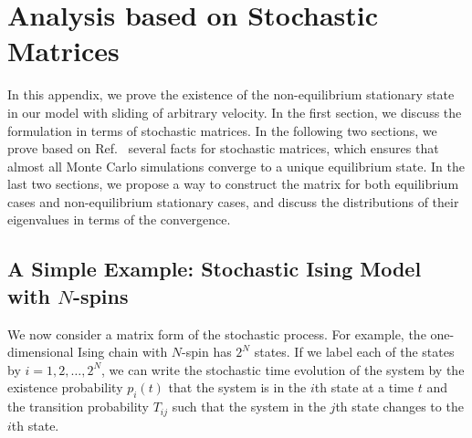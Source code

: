 
\chapter{Analysis based on Stochastic Matrices}\label{chap:ProofEx}

In this appendix, we prove the existence of the non-equilibrium stationary state in our model with sliding of arbitrary velocity. In the first section, we discuss the formulation in terms of stochastic matrices. In the following two sections, we prove based on Ref.~\cite{Hara2011} several facts for stochastic matrices, which ensures that almost all Monte Carlo simulations converge to a unique equilibrium state. In the last two sections, we propose a way to construct the matrix for both equilibrium cases and non-equilibrium stationary cases, and discuss the distributions of their eigenvalues in terms of the convergence.

\section{A Simple Example: Stochastic Ising Model with $N$-spins}
We now consider a matrix form of the stochastic process. For example, the one-dimensional Ising chain with $N$-spin has $2^{N}$ states. If we label each of the states by $i=1,2,\dots,2^{N}$, we can write the stochastic time evolution of the system by the existence probability $p_{i}(t)$ that the system is in the $i$th state at a time $t$ and the transition probability $T_{ij}$ such that the system in the $j$th state changes to the $i$th state.

